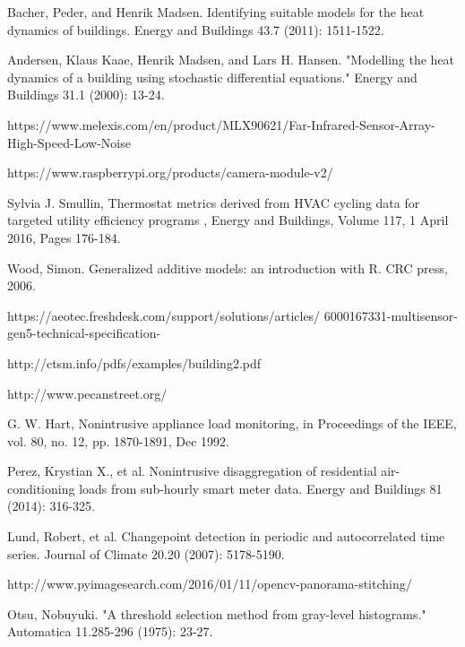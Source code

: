 \documentclass{sig-alternate}
\begin{document}
\begin{thebibliography}{Xyz12}

 Bacher, Peder, and Henrik Madsen.  Identifying suitable models for the heat dynamics of buildings.  Energy and Buildings 43.7 (2011): 1511-1522. 

 Andersen, Klaus Kaae, Henrik Madsen, and Lars H. Hansen. "Modelling the heat dynamics of a building using stochastic differential equations." Energy and Buildings 31.1 (2000): 13-24.

 https://www.melexis.com/en/product/MLX90621/Far-Infrared-Sensor-Array-High-Speed-Low-Noise

  https://www.raspberrypi.org/products/camera-module-v2/
 
 Sylvia J. Smullin, Thermostat metrics derived from HVAC cycling data for targeted utility efficiency programs , Energy and Buildings, Volume 117, 1 April 2016, Pages 176-184.

 Wood, Simon. Generalized additive models: an introduction with R. CRC press, 2006.


 https://aeotec.freshdesk.com/support/solutions/articles/ 6000167331-multisensor-gen5-technical-specification-

 http://ctsm.info/pdfs/examples/building2.pdf

 http://www.pecanstreet.org/

 G. W. Hart, Nonintrusive appliance load monitoring, in Proceedings of the IEEE, vol. 80, no. 12, pp. 1870-1891, Dec 1992.

 Perez, Krystian X., et al. Nonintrusive disaggregation of residential air-conditioning loads from sub-hourly smart meter data. Energy and Buildings 81 (2014): 316-325.

 Lund, Robert, et al. Changepoint detection in periodic and autocorrelated time series. Journal of Climate 20.20 (2007): 5178-5190.

 http://www.pyimagesearch.com/2016/01/11/opencv-panorama-stitching/


 Otsu, Nobuyuki. "A threshold selection method from gray-level histograms." Automatica 11.285-296 (1975): 23-27.

\end{thebibliography}
\end{document}
